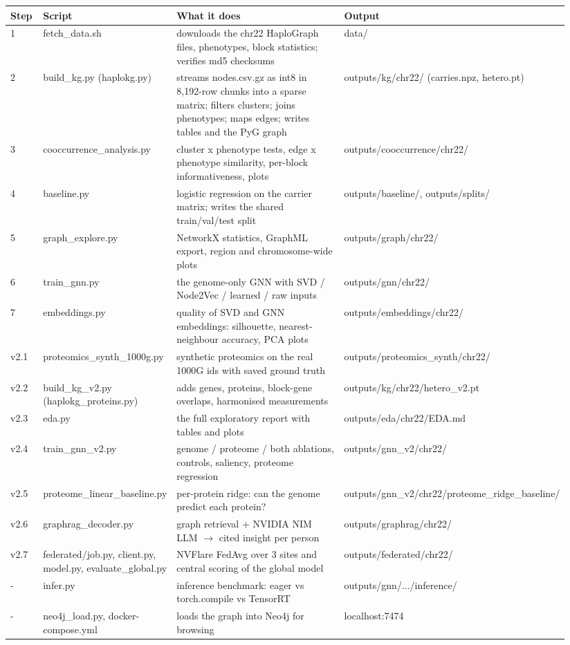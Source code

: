 \documentclass[11pt,a4paper]{article}
\begin{document}
\begin{longtable}{p{0.066\linewidth}p{0.235\linewidth}p{0.423\linewidth}p{0.216\linewidth}}
\toprule
\textbf{Step} & \textbf{Script} & \textbf{What it does} & \textbf{Output} \\
\midrule
\endhead
1 & fetch\_data.sh & downloads the chr22 HaploGraph files, phenotypes, block statistics; verifies md5 checksums & data/ \\
2 & build\_kg.py (haplokg.py) & streams nodes.csv.gz as int8 in 8,192-row chunks into a sparse matrix; filters clusters; joins phenotypes; maps edges; writes tables and the PyG graph & outputs/kg/chr22/ (carries.npz, hetero.pt) \\
3 & cooccurrence\_analysis.py & cluster x phenotype tests, edge x phenotype similarity, per-block informativeness, plots & outputs/cooccurrence/chr22/ \\
4 & baseline.py & logistic regression on the carrier matrix; writes the shared train/val/test split & outputs/baseline/, outputs/splits/ \\
5 & graph\_explore.py & NetworkX statistics, GraphML export, region and chromosome-wide plots & outputs/graph/chr22/ \\
6 & train\_gnn.py & the genome-only GNN with SVD / Node2Vec / learned / raw inputs & outputs/gnn/chr22/ \\
7 & embeddings.py & quality of SVD and GNN embeddings: silhouette, nearest-neighbour accuracy, PCA plots & outputs/embeddings/chr22/ \\
v2.1 & proteomics\_synth\_1000g.py & synthetic proteomics on the real 1000G ids with saved ground truth & outputs/proteomics\_synth/chr22/ \\
v2.2 & build\_kg\_v2.py (haplokg\_proteins.py) & adds genes, proteins, block-gene overlaps, harmonised measurements & outputs/kg/chr22/hetero\_v2.pt \\
v2.3 & eda.py & the full exploratory report with tables and plots & outputs/eda/chr22/EDA.md \\
v2.4 & train\_gnn\_v2.py & genome / proteome / both ablations, controls, saliency, proteome regression & outputs/gnn\_v2/chr22/ \\
v2.5 & proteome\_linear\_baseline.py & per-protein ridge: can the genome predict each protein? & outputs/gnn\_v2/chr22/proteome\_ridge\_baseline/ \\
v2.6 & graphrag\_decoder.py & graph retrieval + NVIDIA NIM LLM $\rightarrow$ cited insight per person & outputs/graphrag/chr22/ \\
v2.7 & federated/job.py, client.py, model.py, evaluate\_global.py & NVFlare FedAvg over 3 sites and central scoring of the global model & outputs/federated/chr22/ \\
- & infer.py & inference benchmark: eager vs torch.compile vs TensorRT & outputs/gnn/.../inference/ \\
- & neo4j\_load.py, docker-compose.yml & loads the graph into Neo4j for browsing & localhost:7474 \\
\bottomrule
\end{longtable}
\end{document}
